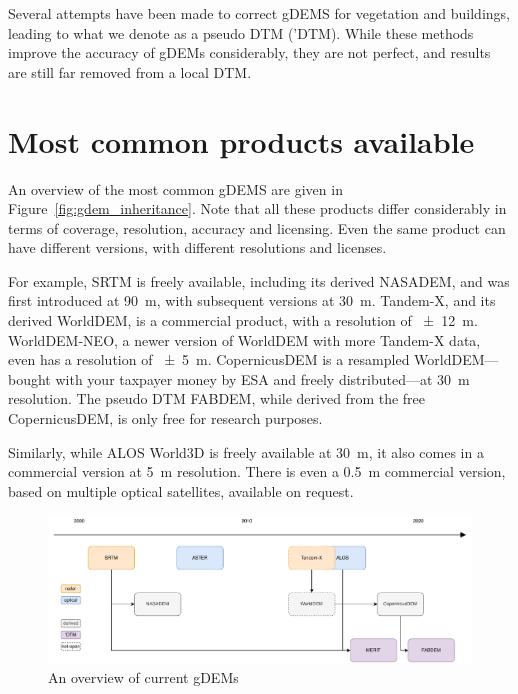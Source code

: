 Several attempts have been made to correct gDEMS for vegetation and buildings, leading to what we denote as a pseudo DTM ('DTM).
While these methods improve the accuracy of gDEMs considerably, they are not perfect, and results are still far removed from a local DTM.

%
\section[Most common products]{Most common products available}

An overview of the most common gDEMS are given in Figure~\ref{fig:gdem_inheritance}.
Note that all these products differ considerably in terms of coverage, resolution, accuracy and licensing.
Even the same product can have different versions, with different resolutions and licenses.

For example, SRTM is freely available, including its derived NASADEM, and was first introduced at \qty{90}{m}, with subsequent versions at \qty{30}{m}.
Tandem-X, and its derived WorldDEM, is a commercial product, with a resolution of \qty{\pm12}{m}.
WorldDEM-NEO, a newer version of WorldDEM with more Tandem-X data, even has a resolution of \qty{\pm5}{m}.
CopernicusDEM is a resampled WorldDEM---bought with your taxpayer money by ESA and freely distributed---at \qty{30}{m} resolution.
The pseudo DTM FABDEM, while derived from the free CopernicusDEM, is only free for research purposes.

Similarly, while ALOS World3D is freely available at \qty{30}{m}, it also comes in a commercial version at \qty{5}{m} resolution.
There is even a \qty{0.5}{m} commercial version, based on multiple optical satellites, available on request.



\begin{figure}
  \centering
  \includegraphics[width=\linewidth]{dems_overview}
  \caption{An overview of current gDEMs}%
\end{figure}

